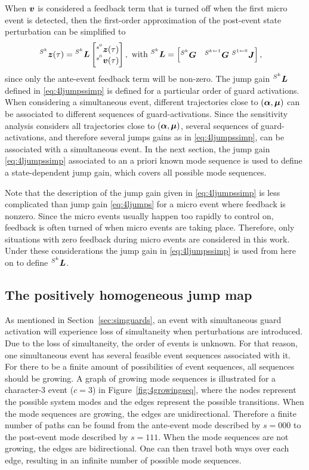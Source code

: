\documentclass[../DC2017114Bouma.tex]{subfiles}
\begin{document}
When ${\boldsymbol{v}}$ is considered a feedback term that is turned off when the first micro event is detected, then the first-order approximation of the post-event state perturbation can be simplified to
\begin{align}
\hspace{0cm}^{S^k}{\boldsymbol{z}}(\tau) &= \hspace{0cm}^{S^k}{\boldsymbol{L}} \begin{bmatrix}
\hspace{0cm}^{s^0}{\boldsymbol{z}}(\tau) \\ \hspace{0cm}^{s^0}{\boldsymbol{v}}(\tau)
\end{bmatrix}, \text{ with }\hspace{0cm}^{S^k}{\boldsymbol{L}} = \begin{bmatrix}
\hspace{0cm}^{S^k}{\boldsymbol{G}} & \hspace{0cm}^{S^{k\leftarrow 1}}{\boldsymbol{G}}\ \hspace{0cm}^{S^{1\leftarrow 0}}{\boldsymbol{J}}
\end{bmatrix},\label{eq:4ljumpssimp}
\end{align}
since only the ante-event feedback term will be non-zero. The jump gain $\hspace{0cm}^{S^k}{\boldsymbol{L}}$ defined in \eqref{eq:4ljumpssimp} is defined for a particular order of guard activations. When considering a simultaneous event, different trajectories close to $(\boldsymbol{\alpha},\boldsymbol{\mu})$ can be associated to different sequences of guard-activations. Since the sensitivity analysis considers all trajectories close to $(\boldsymbol{\alpha},\boldsymbol{\mu})$, several sequences of guard-activations, and therefore several jumps gains as in \eqref{eq:4ljumpssimp}, can be associated with a simultaneous event. In the next section, the jump gain \eqref{eq:4ljumpssimp} associated to an a priori known mode sequence is used to define a state-dependent jump gain, which covers all possible mode sequences. 

Note that the description of the jump gain given in \eqref{eq:4ljumpssimp} is less complicated than jump gain \eqref{eq:4ljumps} for a micro event where feedback is nonzero. Since the micro events usually happen too rapidly to control on, feedback is often turned of when micro events are taking place. Therefore, only situations with zero feedback during micro events are considered in this work. Under these considerations the jump gain in \eqref{eq:4ljumpssimp} is used from here on to define $\hspace{0cm}^{S^k}{\boldsymbol{L}}$.

\subsection{The positively homogeneous jump map}
As mentioned in Section~\ref{sec:simguards}, an event with simultaneous guard activation will experience loss of simultaneity when perturbations are introduced. Due to the loss of simultaneity, the order of events is unknown. For that reason, one simultaneous event has several feasible event sequences associated with it. For there to be a finite amount of possibilities of event sequences, all sequences should be growing. A graph of growing mode sequences is illustrated for a character-3 event ($c=3$) in Figure~\ref{fig:4growingseq}, where the nodes represent the possible system modes and the edges represent the possible transitions. When the mode sequences are growing, the edges are unidirectional. Therefore a finite number of paths can be found from the ante-event mode described by $s = 000$ to the post-event mode described by $s = 111$. When the mode sequences are not growing, the edges are bidirectional. One can then travel both ways over each edge, resulting in an infinite number of possible mode sequences.
\end{document}
